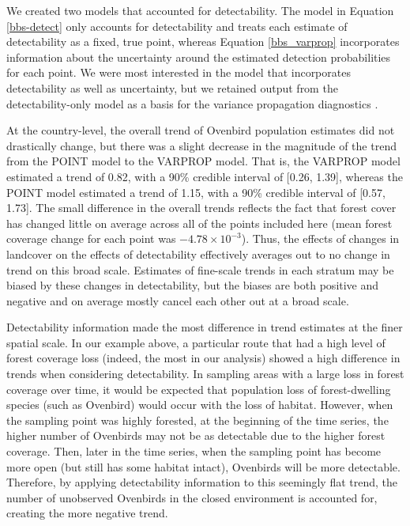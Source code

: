 \documentclass[12pt]{article}
\begin{document}
\par We created two models that accounted for detectability.
The model in Equation \ref{bbs-detect} only accounts for detectability and treats each estimate of detectability as a fixed, true point, whereas Equation \ref{bbs_varprop} incorporates information about the uncertainty around the estimated detection probabilities for each point.
We were most interested in the model that incorporates detectability as well as uncertainty, but we retained output from the detectability-only model as a basis for the variance propagation diagnostics \citep{bravington_variance_2021}.

\par At the country-level, the overall trend of Ovenbird population estimates did not drastically change, but there was a slight decrease in the magnitude of the trend from the POINT model to the VARPROP model.
That is, the VARPROP model estimated a trend of 0.82, with a 90\% credible interval of [0.26, 1.39], whereas the POINT model estimated a trend of 1.15, with a 90\% credible interval of [0.57, 1.73].
The small difference in the overall trends reflects the fact that forest cover has changed little on average across all of the points included here (mean forest coverage change for each point was $-4.78 \times 10^{-3}$).
Thus, the effects of changes in landcover on the effects of detectability effectively averages out to no change in trend on this broad scale.
Estimates of fine-scale trends in each stratum may be biased by these changes in detectability, but the biases are both positive and negative and on average mostly cancel each other out at a broad scale. 

\par Detectability information made the most difference in trend estimates at the finer spatial scale.
In our example above, a particular route that had a high level of forest coverage loss (indeed, the most in our analysis) showed a high difference in trends when considering detectability.
In sampling areas with a large loss in forest coverage over time, it would be expected that population loss of forest-dwelling species (such as Ovenbird) would occur with the loss of habitat.
However, when the sampling point was highly forested, at the beginning of the time series, the higher number of Ovenbirds may not be as detectable due to the higher forest coverage.
Then, later in the time series, when the sampling point has become more open (but still has some habitat intact), Ovenbirds will be more detectable.
Therefore, by applying detectability information to this seemingly flat trend, the number of unobserved Ovenbirds in the closed environment is accounted for, creating the more negative trend.
\end{document}
